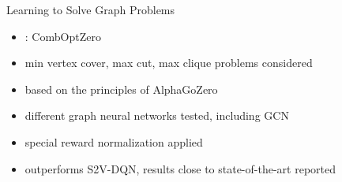 \documentclass[aspectratio=1610]{beamer}
\newcommand{\important}[1]{{\color{green!60!black}#1}}
\begin{document}
\begin{frame}{Learning to Solve Graph Problems}
	\begin{itemize}
		\itemsep1.1ex
		\item {}: \important{CombOptZero}
		\item min vertex cover, max cut, max clique problems considered
		\item based on the principles of \important{AlphaGoZero}
		\item \important{different graph neural networks} tested, including GCN
		\item special reward normalization applied
		\item outperforms S2V-DQN, results close to state-of-the-art reported
		
	\end{itemize}
\end{frame}



\end{document}

